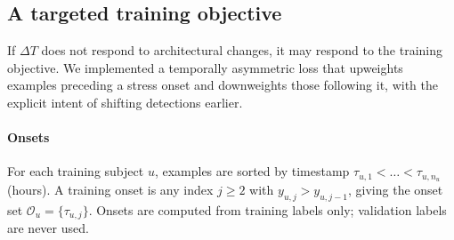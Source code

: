 \documentclass[preprint,12pt,authoryear]{elsarticle}
\newcommand{\dt}{$\Delta T$}
\providecommand{\DIFaddtex}[1]{{\protect\color{blue} \sf #1}} %
\providecommand{\DIFaddbegin}{} %
\providecommand{\DIFaddend}{} %
\providecommand{\DIFdelbegin}{} %
\providecommand{\DIFdelend}{} %
\providecommand{\DIFadd}[1]{\texorpdfstring{\DIFaddtex{#1}}{#1}} %
\newcommand{\DIFscaledelfig}{0.5}
\newlength{\DIFdelgraphicswidth} %
\newlength{\DIFdelgraphicsheight} %
\newcommand{\DIFaddincludegraphics}[2][]{{\color{blue}\fbox{\DIFOincludegraphics[#1]{#2}}}} %
\newcommand{\DIFdelincludegraphics}[2][]{%
\sbox{\DIFdelgraphicsbox}{\DIFOincludegraphics[#1]{#2}}%
\settoboxwidth{\DIFdelgraphicswidth}{\DIFdelgraphicsbox} %
\settoboxtotalheight{\DIFdelgraphicsheight}{\DIFdelgraphicsbox} %
\scalebox{\DIFscaledelfig}{%
\parbox[b]{\DIFdelgraphicswidth}{\usebox{\DIFdelgraphicsbox}\\[-\baselineskip] \rule{\DIFdelgraphicswidth}{0em}}\llap{\resizebox{\DIFdelgraphicswidth}{\DIFdelgraphicsheight}{%
\setlength{\unitlength}{\DIFdelgraphicswidth}%
\begin{picture}(1,1)%
\thicklines\linethickness{2pt} %
{\color[rgb]{1,0,0}\put(0,0){\framebox(1,1){}}}%
{\color[rgb]{1,0,0}\put(0,0){\line( 1,1){1}}}%
{\color[rgb]{1,0,0}\put(0,1){\line(1,-1){1}}}%
\end{picture}%
}\hspace*{3pt}}} %
} %
\DeclareRobustCommand{\DIFaddbegin}{\DIFOaddbegin \let\includegraphics\DIFaddincludegraphics} %
\DeclareRobustCommand{\DIFaddend}{\DIFOaddend \let\includegraphics\DIFOincludegraphics} %
\DeclareRobustCommand{\DIFdelbegin}{\DIFOdelbegin \let\includegraphics\DIFdelincludegraphics} %
\DeclareRobustCommand{\DIFdelend}{\DIFOaddend \let\includegraphics\DIFOincludegraphics} %
\begin{document}
\subsection{A targeted training objective}

If \dt{} does not respond to architectural changes, it may respond to
the training objective. We implemented a temporally asymmetric loss that
upweights examples preceding a stress onset and downweights those
following it, with the explicit intent of shifting detections earlier.

\DIFdelbegin %
\DIFdelend \DIFaddbegin \paragraph{Onsets} \DIFadd{For each training subject $u$, examples are sorted
by timestamp $\tau_{u,1} < \dots < \tau_{u,n_u}$ (hours). A training
onset is any index $j \ge 2$ with $y_{u,j} > y_{u,j-1}$, giving the
onset set $\mathcal{O}_u = \{\tau_{u,j}\}$. Onsets are computed from
training labels only; validation labels are never used.
}\DIFaddend 
\end{document}
